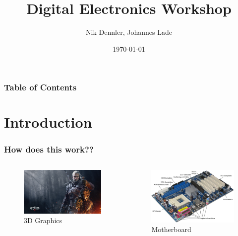 \documentclass{beamer}
\begin{document}
\title{Digital Electronics Workshop} 
\author{Nik Dennler, Johannes Lade}
\date{\today} 

\begin{frame}
\titlepage
\end{frame} 

\begin{frame}\frametitle{Table of Contents}\tableofcontents
\end{frame} 


\section{Introduction}
\begin{frame}\frametitle{How does this work??}
  \begin{columns}
  \begin{column}{6cm}
  \begin{figure}
  \includegraphics[width=1\textwidth]{witcher}
  \caption{3D Graphics}
  \end{figure}
  \end{column}
  \begin{column}{6cm}
  \begin{figure}
  \includegraphics[width=1\textwidth]{motherboard}
  \caption{Motherboard}
  \end{figure}
  \end{column}
  \end{columns}
\end{frame}
\end{document}
